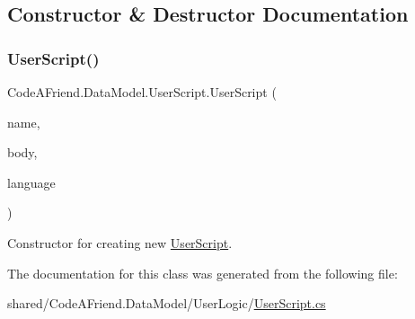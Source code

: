\subsection{Constructor \& Destructor Documentation}
\mbox{\label{class_code_a_friend_1_1_data_model_1_1_user_script_a2d9bbf3cdb8d330b15c7bb18f9b5c145}} 
\subsubsection{\texorpdfstring{User\+Script()}{UserScript()}}
{\footnotesize\ttfamily Code\+A\+Friend.\+Data\+Model.\+User\+Script.\+User\+Script (\begin{DoxyParamCaption}\item[{string}]{name,  }\item[{string}]{body,  }\item[{\mbox{\hyperlink{namespace_code_a_friend_1_1_data_model_a13e088c525db1b03a4de75420ced79b2}{Supported\+Language}}}]{language }\end{DoxyParamCaption})}



Constructor for creating new \mbox{\hyperlink{class_code_a_friend_1_1_data_model_1_1_user_script}{User\+Script}}.



The documentation for this class was generated from the following file\+:\begin{DoxyCompactItemize}
\item 
shared/\+Code\+A\+Friend.\+Data\+Model/\+User\+Logic/\mbox{\hyperlink{_user_script_8cs}{User\+Script.\+cs}}\end{DoxyCompactItemize}
